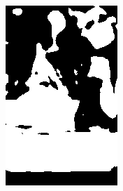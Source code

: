 \begin{figure}[h]
{\begin{subfigure}[b]{0.23\textwidth}
         \includegraphics[width=\textwidth]{images/results/cross_st/clay_dark_med_skinny_92.png}
     \end{subfigure}
    \hfill
     \begin{subfigure}[b]{0.23\textwidth}
         \centering

\end{subfigure}}
\end{figure}
